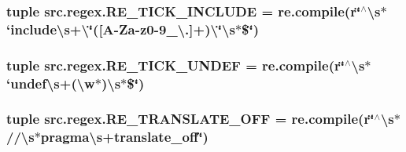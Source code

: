 \hypertarget{namespacesrc_1_1regex_ae69a7c456a3589208559f5347d7221ad}{
\subsubsection[{R\-E\-\_\-\-T\-I\-C\-K\-\_\-\-I\-N\-C\-L\-U\-D\-E}]{\setlength{\rightskip}{0pt plus 5cm}tuple src.\-regex.\-R\-E\-\_\-\-T\-I\-C\-K\-\_\-\-I\-N\-C\-L\-U\-D\-E = re.\-compile(r\char`\"{}$^\wedge$\textbackslash{}s$\ast$`include\textbackslash{}s+\textbackslash{}\char`\"{}(\mbox{[}A-\/Za-\/z0-\/9\-\_\-\textbackslash{}.\mbox{]}+)\textbackslash{}\char`\"{}\textbackslash{}s$\ast$\$\char`\"{})}}\label{namespacesrc_1_1regex_ae69a7c456a3589208559f5347d7221ad}
\hypertarget{namespacesrc_1_1regex_aec14c5cdf0e22540fed3923a358dc928}{
\subsubsection[{R\-E\-\_\-\-T\-I\-C\-K\-\_\-\-U\-N\-D\-E\-F}]{\setlength{\rightskip}{0pt plus 5cm}tuple src.\-regex.\-R\-E\-\_\-\-T\-I\-C\-K\-\_\-\-U\-N\-D\-E\-F = re.\-compile(r\char`\"{}$^\wedge$\textbackslash{}s$\ast$`undef\textbackslash{}s+(\textbackslash{}w$\ast$)\textbackslash{}s$\ast$\$\char`\"{})}}\label{namespacesrc_1_1regex_aec14c5cdf0e22540fed3923a358dc928}
\hypertarget{namespacesrc_1_1regex_a3bfb4bbec2ba8a173fda401c59fa1971}{
\subsubsection[{R\-E\-\_\-\-T\-R\-A\-N\-S\-L\-A\-T\-E\-\_\-\-O\-F\-F}]{\setlength{\rightskip}{0pt plus 5cm}tuple src.\-regex.\-R\-E\-\_\-\-T\-R\-A\-N\-S\-L\-A\-T\-E\-\_\-\-O\-F\-F = re.\-compile(r\char`\"{}$^\wedge$\textbackslash{}s$\ast$//\textbackslash{}s$\ast$pragma\textbackslash{}s+translate\-\_\-off\char`\"{})}}\label{namespacesrc_1_1regex_a3bfb4bbec2ba8a173fda401c59fa1971}
